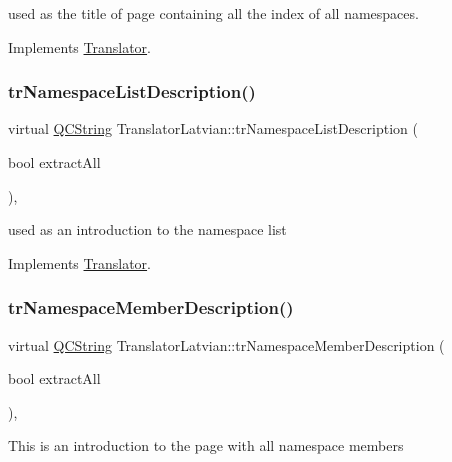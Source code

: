 used as the title of page containing all the index of all namespaces. 

Implements \mbox{\hyperlink{class_translator}{Translator}}.

\mbox{\label{class_translator_latvian_a96bc2bcb265c451f3758338b1ab3500f}} 
\subsubsection{\texorpdfstring{trNamespaceListDescription()}{trNamespaceListDescription()}}
{\footnotesize\ttfamily virtual \mbox{\hyperlink{class_q_c_string}{Q\+C\+String}} Translator\+Latvian\+::tr\+Namespace\+List\+Description (\begin{DoxyParamCaption}\item[{bool}]{extract\+All }\end{DoxyParamCaption})\hspace{0.3cm}{\ttfamily [inline]}, {\ttfamily [virtual]}}

used as an introduction to the namespace list 

Implements \mbox{\hyperlink{class_translator}{Translator}}.

\mbox{\label{class_translator_latvian_a8107165bea06594e1ca56c4e29dd8681}} 
\subsubsection{\texorpdfstring{trNamespaceMemberDescription()}{trNamespaceMemberDescription()}}
{\footnotesize\ttfamily virtual \mbox{\hyperlink{class_q_c_string}{Q\+C\+String}} Translator\+Latvian\+::tr\+Namespace\+Member\+Description (\begin{DoxyParamCaption}\item[{bool}]{extract\+All }\end{DoxyParamCaption})\hspace{0.3cm}{\ttfamily [inline]}, {\ttfamily [virtual]}}

This is an introduction to the page with all namespace members 

